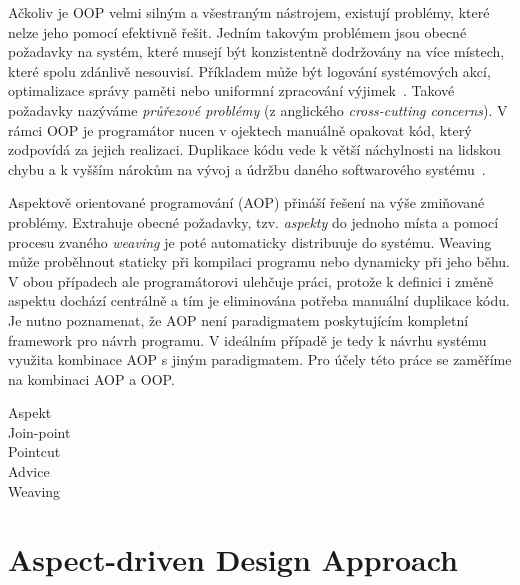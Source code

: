 Ačkoliv je OOP velmi silným a všestraným nástrojem,
existují problémy, které nelze jeho pomocí efektivně řešit.
Jedním takovým problémem jsou obecné požadavky na systém,
které musejí být konzistentně dodržovány na více místech,
které spolu zdánlivě nesouvisí. Příkladem
může být logování systémových akcí, optimalizace správy paměti
nebo uniformní zpracování výjimek~\cite{kiczales1997aspect}.
Takové požadavky nazýváme \textit{průřezové problémy}
(z anglického \textit{cross-cutting concerns}).
V rámci OOP je programátor nucen v ojektech manuálně opakovat
kód, který zodpovídá za jejich realizaci. Duplikace kódu
vede k větší náchylnosti na lidskou chybu a k vyšším nárokům na vývoj
a údržbu daného softwarového systému~\cite{fowler1999refactoring}.

Aspektově orientované programování (AOP) přináší řešení na
výše zmiňované problémy. Extrahuje obecné požadavky,
tzv. \textit{aspekty} do jednoho místa a pomocí procesu zvaného
\textit{weaving} je poté automaticky distribuuje do systému.
Weaving může proběhnout staticky při kompilaci programu nebo dynamicky
při jeho běhu. V obou případech ale programátorovi ulehčuje práci,
protože k definici i změně aspektu dochází centrálně a tím je eliminována
potřeba manuální duplikace kódu. Je nutno poznamenat, že AOP není
paradigmatem poskytujícím kompletní framework pro návrh programu.
V ideálním případě je tedy k návrhu systému využita kombinace
AOP s jiným paradigmatem. Pro účely této práce se zaměříme na
kombinaci AOP a OOP.


\begin{description}
    \item [Aspekt]
    \item [Join-point]
    \item [Pointcut]
    \item [Advice]
    \item [Weaving]
\end{description}

\section{Aspect-driven Design Approach}

